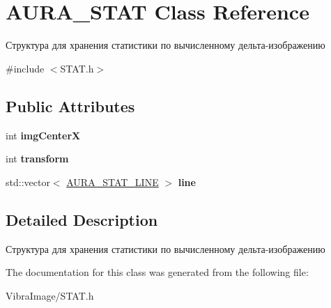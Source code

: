 \hypertarget{class_a_u_r_a___s_t_a_t}{\section{A\+U\+R\+A\+\_\+\+S\+T\+A\+T Class Reference}
\label{class_a_u_r_a___s_t_a_t}
}


Структура для хранения статистики по вычисленному дельта-\/изображению  




{\ttfamily \#include $<$S\+T\+A\+T.\+h$>$}

\subsection*{Public Attributes}
\begin{DoxyCompactItemize}
\item 
\hypertarget{class_a_u_r_a___s_t_a_t_a02c06367a1ba790c4556666c9a6d0395}{int {\bfseries img\+Center\+X}}\label{class_a_u_r_a___s_t_a_t_a02c06367a1ba790c4556666c9a6d0395}

\item 
\hypertarget{class_a_u_r_a___s_t_a_t_ad8264a616ff0f5313b67912a3b2f2ce4}{int {\bfseries transform}}\label{class_a_u_r_a___s_t_a_t_ad8264a616ff0f5313b67912a3b2f2ce4}

\item 
\hypertarget{class_a_u_r_a___s_t_a_t_ad95e3143bfee39762a1e64ea5a25000e}{std\+::vector$<$ \hyperlink{class_a_u_r_a___s_t_a_t___l_i_n_e}{A\+U\+R\+A\+\_\+\+S\+T\+A\+T\+\_\+\+L\+I\+N\+E} $>$ {\bfseries line}}\label{class_a_u_r_a___s_t_a_t_ad95e3143bfee39762a1e64ea5a25000e}

\end{DoxyCompactItemize}


\subsection{Detailed Description}
Структура для хранения статистики по вычисленному дельта-\/изображению 



The documentation for this class was generated from the following file\+:\begin{DoxyCompactItemize}
\item 
Vibra\+Image/S\+T\+A\+T.\+h\end{DoxyCompactItemize}
